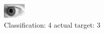 \begin{figure}[h!]
\begin{center}
\includegraphics[width=0.60\columnwidth]{figures/ID189_class_4_target_3.png}
\end{center}
\caption{ Classification: 4 actual target: 3}
\label{fig:ID189_class_4_target_3}
\end{figure}
